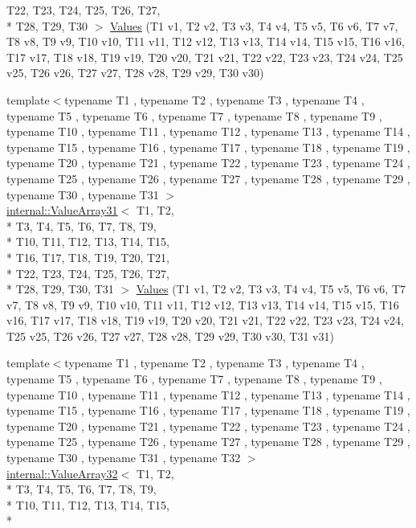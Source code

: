 \begin{DoxyCompactItemize}
T22, T23, T24, T25, T26, T27, \\*
T28, T29, T30 $>$ \hyperlink{namespacetesting_a016767be70ad0412bdbf837bc4d3ca98}{Values} (T1 v1, T2 v2, T3 v3, T4 v4, T5 v5, T6 v6, T7 v7, T8 v8, T9 v9, T10 v10, T11 v11, T12 v12, T13 v13, T14 v14, T15 v15, T16 v16, T17 v17, T18 v18, T19 v19, T20 v20, T21 v21, T22 v22, T23 v23, T24 v24, T25 v25, T26 v26, T27 v27, T28 v28, T29 v29, T30 v30)
\item 
{\footnotesize template$<$typename T1 , typename T2 , typename T3 , typename T4 , typename T5 , typename T6 , typename T7 , typename T8 , typename T9 , typename T10 , typename T11 , typename T12 , typename T13 , typename T14 , typename T15 , typename T16 , typename T17 , typename T18 , typename T19 , typename T20 , typename T21 , typename T22 , typename T23 , typename T24 , typename T25 , typename T26 , typename T27 , typename T28 , typename T29 , typename T30 , typename T31 $>$ }\\\hyperlink{classtesting_1_1internal_1_1_value_array31}{internal\-::\-Value\-Array31}$<$ T1, T2, \\*
T3, T4, T5, T6, T7, T8, T9, \\*
T10, T11, T12, T13, T14, T15, \\*
T16, T17, T18, T19, T20, T21, \\*
T22, T23, T24, T25, T26, T27, \\*
T28, T29, T30, T31 $>$ \hyperlink{namespacetesting_a40d9696e1754455c8329a866c17ed7bb}{Values} (T1 v1, T2 v2, T3 v3, T4 v4, T5 v5, T6 v6, T7 v7, T8 v8, T9 v9, T10 v10, T11 v11, T12 v12, T13 v13, T14 v14, T15 v15, T16 v16, T17 v17, T18 v18, T19 v19, T20 v20, T21 v21, T22 v22, T23 v23, T24 v24, T25 v25, T26 v26, T27 v27, T28 v28, T29 v29, T30 v30, T31 v31)
\item 
{\footnotesize template$<$typename T1 , typename T2 , typename T3 , typename T4 , typename T5 , typename T6 , typename T7 , typename T8 , typename T9 , typename T10 , typename T11 , typename T12 , typename T13 , typename T14 , typename T15 , typename T16 , typename T17 , typename T18 , typename T19 , typename T20 , typename T21 , typename T22 , typename T23 , typename T24 , typename T25 , typename T26 , typename T27 , typename T28 , typename T29 , typename T30 , typename T31 , typename T32 $>$ }\\\hyperlink{classtesting_1_1internal_1_1_value_array32}{internal\-::\-Value\-Array32}$<$ T1, T2, \\*
T3, T4, T5, T6, T7, T8, T9, \\*
T10, T11, T12, T13, T14, T15, \\*

\end{DoxyCompactItemize}

